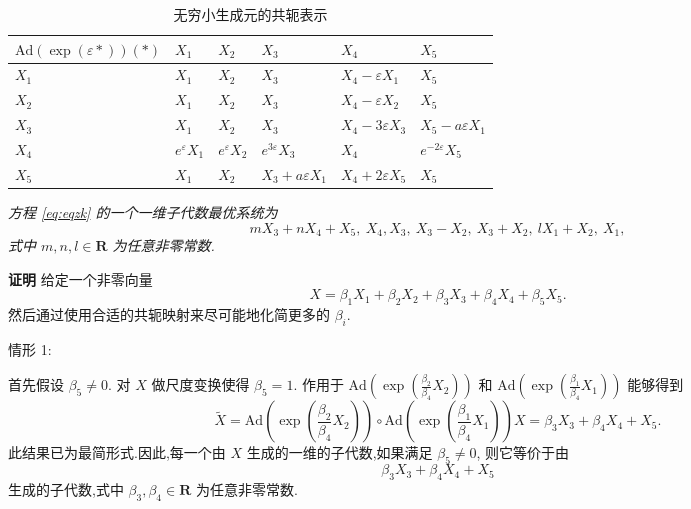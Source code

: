 \begin{table}[!h]
\centering
\caption{{无穷小生成元的共轭表示}}
\label{tab:table1}
\begin{tabularx}{\linewidth}{XXXXXX}
\toprule[1.5pt]
$\mbox{Ad}(\exp(\varepsilon *))(*)$&$X_{1}$&$X_{2}$&$X_{3}$&$X_{4}$&$X_{5}$\\
\midrule[1pt]
$X_{1}$&$X_{1}$&$X_{2}$&$X_{3}$&$X_{4}-\varepsilon X_{1}$&$X_{5}$\\
$X_{2}$&$X_{1}$&$X_{2}$&$X_{3}$&$X_{4}-\varepsilon X_{2}$&$X_{5}$\\
$X_{3}$&$X_{1}$&$X_{2}$&$X_{3}$&$X_{4}-3\varepsilon X_{3}$&$X_{5}-a\varepsilon X_{1}$\\
$X_{4}$&$e^{\varepsilon}X_{1}$&$e^{\varepsilon}X_{2}$&$e^{3\varepsilon}X_{3}$&$X_{4}$&$e^{-2\varepsilon}X_{5}$\\
$X_{5}$&$X_{1}$&$X_{2}$&$X_{3}+a\varepsilon X_{1}$&$X_{4}+2\varepsilon X_{5}$&$X_{5}$\\
\bottomrule[1.5pt]
\end{tabularx}
\end{table}

\begin{theorem}
\emph{方程 \eqref{eq:eqzk} 的一个一维子代数最优系统为
\begin{equation*}
	mX_{3}+nX_{4}+X_{5},~ X_{4}, X_{3},~ X_{3}-X_{2}, ~X_{3}+X_{2}, ~lX_{1}+X_{2}, ~X_{1},
\end{equation*}
式中 $m,n,l\in \mathbf{R}$ 为任意非零常数.}
\end{theorem}

{\textbf{证明}} 给定一个非零向量
\begin{equation*}
	X=\beta_{1}X_{1}+\beta_{2}X_{2}+\beta_{3}X_{3}+\beta_{4}X_{4}+\beta_{5}X_{5}.
\end{equation*}
然后通过使用合适的共轭映射来尽可能地化简更多的 $\beta_i$.

情形 1:

首先假设 $\beta_5\neq 0.$ 对 $X$ 做尺度变换使得 $\beta_5=1$. 作用于 $\mbox{Ad}(\exp{(\frac{\beta_2}{\beta_4} X_2)})$ 和 $\mbox{Ad}(\exp{(\frac{\beta_1}{\beta_4} X_1)})$ 能够得到
\begin{equation*}
	\widetilde{X}=\mbox{Ad}(\exp{(\frac{\beta_2}{\beta_4} X_2)})\circ \mbox{Ad}(\exp{(\frac{\beta_1}{\beta_4} X_1)}) X=\beta_{3}X_{3}+\beta_{4}X_{4}+X_{5}.
\end{equation*}
此结果已为最简形式.因此,每一个由 $X$ 生成的一维的子代数,如果满足 $\beta_5\neq 0 $, 则它等价于由
\begin{equation*}
	\beta_{3}X_{3}+\beta_{4}X_{4}+X_{5}
\end{equation*}
生成的子代数,式中 $\beta_{3}, \beta_{4} \in \mathbf{R}$ 为任意非零常数.

